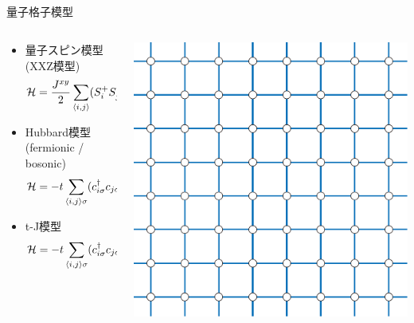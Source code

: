 \subsection*{\redb\whiteb\greenb}
\begin{frame}[fragile]{量子格子模型}
  \begin{columns}[T]
    \begin{column}{.8\textwidth}
      \begin{itemize}
        \setlength{\itemsep}{-.5em}
      \item 量子スピン模型(XXZ模型) \begin{equation*} {\cal H} = \frac{J^{xy}}{2}
        \sum_{\langle i,j \rangle} (S^+_i S^-_j + S^-_i S^+_j) + J^z
        \sum_{\langle i,j \rangle} S^z_i S^z_j \end{equation*}
      \item Hubbard模型 (fermionic / bosonic)
        \begin{equation*} {\cal H} = -t \sum_{\langle i,j \rangle \sigma}
        (c^\dagger_{i\sigma} c_{j\sigma} + \mbox{h.c.}) + U \sum_{i}
        n_{i\uparrow} n_{i\downarrow} \end{equation*}
      \item t-J模型 \begin{equation*} {\cal H} = -t \sum_{\langle i,j \rangle \sigma}
        (c^\dagger_{i\sigma} c_{j\sigma} + \mbox{h.c.}) + J \sum_{i,j}
        ({\bf S}_i \cdot {\bf S}_j - n_{i} n_{j} / 4) \end{equation*}
      \end{itemize}
    \end{column}
    \begin{column}{.2\textwidth}
      \includegraphics[width=\textwidth]{square.pdf}
    \end{column}
  \end{columns}
\end{frame}


